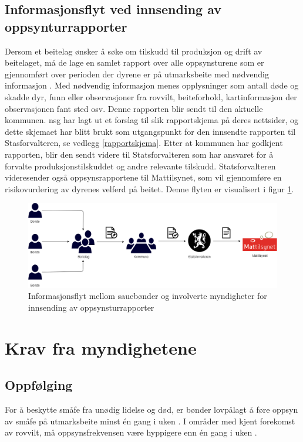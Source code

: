 \subsection{Informasjonsflyt ved innsending av oppsynturrapporter}
Dersom et beitelag ønsker å søke om tilskudd til produksjon og drift av beitelaget, må de lage en samlet rapport over alle oppsynsturene som er gjennomført over perioden der dyrene er på utmarksbeite med nødvendig informasjon \cite{Statsforvalteren2021Styringsdokumenter}. Med nødvendig informasjon menes opplysninger som antall døde og skadde dyr, funn eller observasjoner fra rovvilt, beiteforhold, kartinformasjon der observasjonen fant sted osv. Denne rapporten blir sendt til den aktuelle kommunen. \acrshort{nsg} har lagt ut et forslag til slik rapportskjema på deres nettsider, og dette skjemaet har blitt brukt som utgangspunkt for den innsendte rapporten til Stasforvalteren, se vedlegg \ref{rapportskjema}. Etter at kommunen har godkjent rapporten, blir den sendt videre til Statsforvalteren som har ansvaret for å forvalte produksjonstilskuddet og andre relevante tilskudd. Statsforvalteren videresender også oppsynsrapportene til Mattilsynet, som vil gjennomføre en risikovurdering av dyrenes velferd på beitet. Denne flyten er visualisert i figur \ref{fig:informasjonsflyt_rapport}.

\begin{figure}[H]
\centering
\captionsetup{width=.8\linewidth}
\includegraphics[width=0.9\linewidth]{Figurer/diagram/informasjonsflyt tilsynsrapport.png}
\caption{Informasjonsflyt mellom sauebønder og involverte myndigheter for innsending av oppsynsturrapporter}
\label{fig:informasjonsflyt_rapport}
\end{figure}

\section{Krav fra myndighetene}
\subsection{Oppfølging}
For å beskytte småfe fra unødig lidelse og død, er bønder lovpålagt å føre oppsyn av småfe på utmarksbeite minst én gang i uken \cite{2014ForskriftRovvilt}. I områder med kjent forekomst av rovvilt, må oppsynsfrekvensen være hyppigere enn én gang i uken \cite{2014ForskriftRovvilt}.

